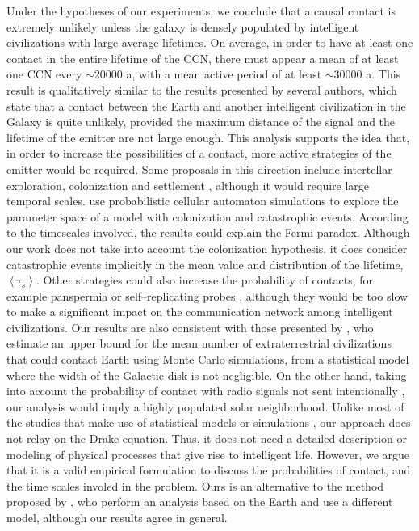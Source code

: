 \documentclass[crop]{CSLB}
\newcommand{\ceti}{CCN}
\begin{document}
Under the hypotheses of our experiments, we conclude that a causal
contact is extremely unlikely unless the galaxy is densely populated
by intelligent civilizations with large average lifetimes.
%
On average, in order to have at least one contact in the entire lifetime
of the \ceti{}, there must appear a mean of at least one \ceti{}
every $\sim$20000 a, with a mean active period of at least
$\sim$30000 a.
%
This result is qualitatively similar to the results presented by
several authors, which state that a contact between the Earth and
another intelligent civilization in the Galaxy is quite unlikely,
provided the maximum distance of the signal and the lifetime of the
emitter are not large enough.
%
This analysis supports the idea that, in order to increase the
possibilities of a contact, more active strategies of the emitter
would be required.
%
Some proposals in this direction include intertellar exploration,
colonization and settlement \citep{brin_great_1983, Dosovic2019,
galera_invasion_2019}, although it would require large temporal
scales.
%
\citet{Dosovic2019} use probabilistic cellular automaton simulations
to explore the parameter space of a model with colonization and
catastrophic events.
%
According to the timescales involved, the results could explain the
Fermi paradox.
%
Although our work does not take into account the colonization
hypothesis, it does consider catastrophic events implicitly in the
mean value and distribution of the lifetime, $\left<\tau_s\right>$.
%
Other strategies could also increase the probability of contacts, for
example panspermia \citep[e.g.,][]{starling_virulence_2013} or
self--replicating probes \citep[e.g.,][]{barlow_galactic_2013},
although they would be too slow to make a significant impact on the
communication network among intelligent civilizations.
%
Our results are also consistent with those presented by
\citet{grimaldi_signal_2017}, who estimate an upper bound for the mean
number of extraterrestrial civilizations that could contact Earth
using Monte Carlo simulations, from a statistical model where the width
of the Galactic disk is not negligible.
%
On the other hand, taking into account the probability of contact with
radio signals not sent intentionally \citep{horvat_calculating_2007},
our analysis would imply a highly populated solar neighborhood.
%
Unlike most 
of the studies that make use of statistical models or
simulations \citep{cirkovic_temporal_2004, smith_broadcasting_2009,
bloetscher_using_2019}, our approach does not relay on the Drake
equation.
%
Thus, it does not need
a detailed description or modeling of physical processes that give rise to
intelligent life.
%
However, we argue that it is a valid empirical formulation to discuss
the probabilities of contact, and the time scales involed in the
problem.
%
Ours is an alternative to the method proposed by
\citet{balbi_impact_2018}, who perform an analysis based on the Earth
and use a different model, although our results agree in general.
\end{document}

